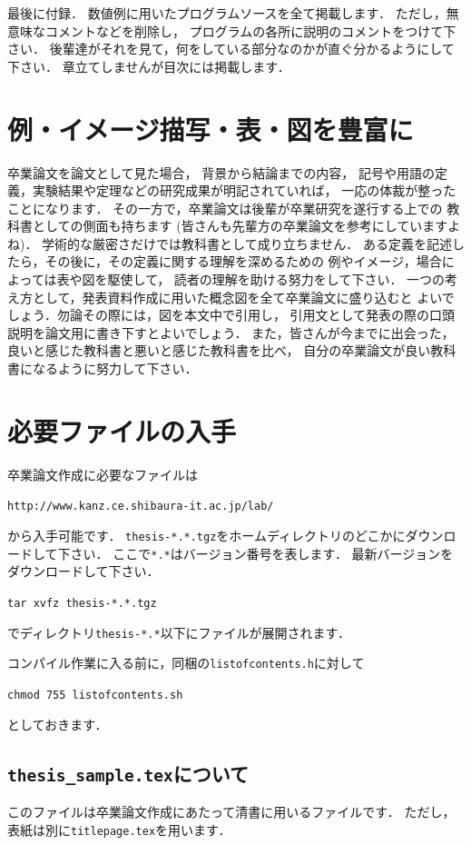 \documentclass[a4j,12pt,dvipdfmx,oneside]{jsbook}
\theoremstyle{definition}
\begin{document}
最後に付録．
数値例に用いたプログラムソースを全て掲載します．
ただし，無意味なコメントなどを削除し，
プログラムの各所に説明のコメントをつけて下さい．
後輩達がそれを見て，何をしている部分なのかが直ぐ分かるようにして下さい．
章立てしませんが目次には掲載します．
%
%
%
\section{例・イメージ描写・表・図を豊富に}\label{sec:thesis_examples}
%
%
%
卒業論文を論文として見た場合，
背景から結論までの内容，
記号や用語の定義，実験結果や定理などの研究成果が明記されていれば，
一応の体裁が整ったことになります．
その一方で，卒業論文は後輩が卒業研究を遂行する上での
教科書としての側面も持ちます
(皆さんも先輩方の卒業論文を参考にしていますよね)．
学術的な厳密さだけでは教科書として成り立ちません．
ある定義を記述したら，その後に，その定義に関する理解を深めるための
例やイメージ，場合によっては表や図を駆使して，
読者の理解を助ける努力をして下さい．
一つの考え方として，発表資料作成に用いた概念図を全て卒業論文に盛り込むと
よいでしょう．勿論その際には，図を本文中で引用し，
引用文として発表の際の口頭説明を論文用に書き下すとよいでしょう．
また，皆さんが今までに出会った，
良いと感じた教科書と悪いと感じた教科書を比べ，
自分の卒業論文が良い教科書になるように努力して下さい．
%
%
%
\section{必要ファイルの入手}\label{sec:thesis_file}
%
%
%
卒業論文作成に必要なファイルは
\begin{center}
\texttt{http://www.kanz.ce.shibaura-it.ac.jp/lab/}
\end{center}
から入手可能です．
\texttt{thesis-*.*.tgz}をホームディレクトリのどこかにダウンロードして下さい．
ここで\texttt{*.*}はバージョン番号を表します．
最新バージョンをダウンロードして下さい．
\begin{screen}
\texttt{tar xvfz thesis-*.*.tgz}
\end{screen}
でディレクトリ\texttt{thesis-*.*}以下にファイルが展開されます．

コンパイル作業に入る前に，同梱の\texttt{listofcontents.h}に対して
\begin{screen}
\texttt{chmod 755 listofcontents.sh}
\end{screen}
としておきます．
%
%
%
\subsection{\texttt{thesis\_sample.tex}について}\label{sec:thesis_sample}
このファイルは卒業論文作成にあたって清書に用いるファイルです．
ただし，表紙は別に\texttt{titlepage.tex}を用います．
\end{document}
